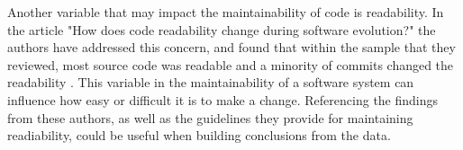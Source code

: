 \documentclass[conference]{IEEEtran}
\begin{document}
Another variable that may impact the maintainability of code is readability. In the article "How does code readability change during software evolution?" the authors have addressed this concern, and found that within the sample that they reviewed, most source code was readable and a minority of commits changed the readability \cite{piantadosi:2020}. This variable in the maintainability of a software system can influence how easy or difficult it is to make a change. Referencing the findings from these authors, as well as the guidelines they provide for maintaining readiability, could be useful when building conclusions from the data.

\newpage


\end{document}
